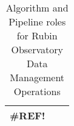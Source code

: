 \normalsize \begin{longtable} {|p{}|p{}|p{}|} \caption{Algorithm and Pipeline roles for Rubin Observatory Data Management Operations \label{tab:aproles}}\\ 
\hline 
\textbf{\#REF!}&& \\ \hline
\end{longtable} \normalsize
